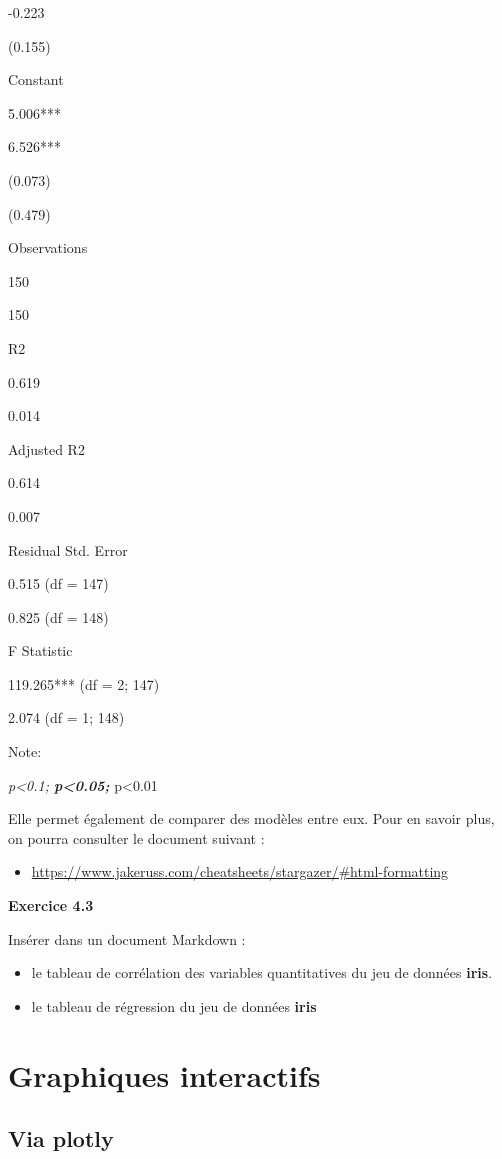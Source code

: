\documentclass[
]{book}
\providecommand{\tightlist}{%
  \setlength{\itemsep}{0pt}\setlength{\parskip}{0pt}}
\theoremstyle{definition}
\theoremstyle{definition}
\theoremstyle{definition}
\theoremstyle{definition}
\theoremstyle{remark}
\begin{document}
-0.223

(0.155)

Constant

5.006***

6.526***

(0.073)

(0.479)

Observations

150

150

R2

0.619

0.014

Adjusted R2

0.614

0.007

Residual Std. Error

0.515 (df = 147)

0.825 (df = 148)

F Statistic

119.265*** (df = 2; 147)

2.074 (df = 1; 148)

Note:

\emph{p\textless0.1; \textbf{p\textless0.05; }}p\textless0.01

Elle permet également de comparer des modèles entre eux. Pour en savoir plus, on pourra consulter le document suivant :

\begin{itemize}
\tightlist
\item
  \url{https://www.jakeruss.com/cheatsheets/stargazer/\#html-formatting}
\end{itemize}

\textbf{Exercice 4.3}

Insérer dans un document Markdown :

\begin{itemize}
\item
  le tableau de corrélation des variables quantitatives du jeu de données \textbf{iris}.
\item
  le tableau de régression du jeu de données \textbf{iris}
\end{itemize}

\hypertarget{graphiques-interactifs}{%
\section{Graphiques interactifs}\label{graphiques-interactifs}}

\hypertarget{via-plotly}{%
\subsection{\texorpdfstring{Via \textbf{plotly}}{Via plotly}}\label{via-plotly}}
\end{document}
